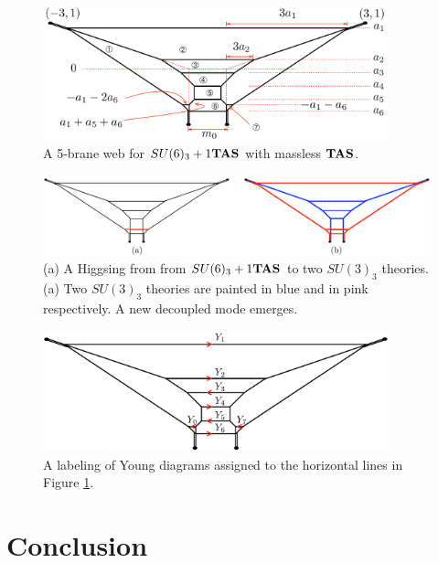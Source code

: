 \documentclass[letterpaper, 11pt]{article}
\begin{document}
{%
\begin{figure}[t]
\centering
\includegraphics[width=10cm]{SU6-monopole.pdf}
\caption{A 5-brane web for $SU(6)_3+1{\bf TAS}$ with massless ${\bf TAS}$.}
\label{fig:SU6-monopole}
\end{figure}

\begin{figure}[t]
\centering
\includegraphics[width=12cm]{SU6-Higgsing.pdf}
\caption{(a) A Higgsing from from $SU(6)_3+1{\bf TAS}$ to two $SU(3)_3$ theories. (a) Two $SU(3)_3$ theories are painted in blue and in pink respectively. A new decoupled mode emerges.}
\label{fig:SU6-Higgsing}
\end{figure}

\begin{figure}[t]
\centering
\includegraphics[width=10cm]{SU6young.pdf}
\caption{A labeling of Young diagrams assigned to the horizontal lines in Figure \ref{fig:SU6-monopole}.}
\label{fig:SU6young}
\end{figure}



\section{Conclusion} \label{sec:conclusion}



}
\end{document}
